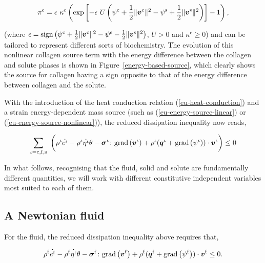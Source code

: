 \begin{equation}
\pi^{\mathrm{c}}=\epsilon\ \kappa^{\mathrm{c}}\left( \mathrm{exp}
\left[-\epsilon\ U \left(\psi^{\mathrm{c}}+\frac{1}{2} \Vert\bv^{\mathrm{c}}\Vert^2 - 
 \psi^{\mathrm{s}}+\frac{1}{2} \Vert\bv^{\mathrm{s}}\Vert^2\right) \right]
 - 1\right),
\label{eu-energy-source-nonlinear}
\end{equation}

\noindent (where $\epsilon =
\mathrm{sign}\left(\psi^{\mathrm{c}}+\frac{1}{2}
\Vert\mbox{\boldmath$ v$}^{\mathrm{c}}\Vert^2 - \psi^{\mathrm{s}}-\frac{1}{2}
\Vert\mbox{\boldmath$ v$}^{\mathrm{s}}\Vert^2\right)$, $U>0$ and
$\kappa^{\mathrm{c}}\geq 0$) and can be tailored to represent
different sorts of biochemistry. The evolution of this nonlinear
collagen source term with the energy difference between the collagen
and solute phases is shown in Figure~\ref{energy-based-source}, which
clearly shows the source for collagen having a sign opposite to that
of the energy difference between collagen and the solute.

With the introduction of the heat conduction relation
(\ref{eu-heat-conduction}) and a strain energy-dependent mass source
(such as (\ref{eu-energy-source-linear}) or
(\ref{eu-energy-source-nonlinear})), the reduced dissipation
inequality now reads,

\begin{equation}
\sum\limits_{\iota=\mathrm{c},\mathrm{f},\mathrm{s}}\ \bigg(\rho^{\iota}
\dot{e^{\iota}} - \rho^{\iota} 
\dot{\eta^{\iota}} \theta
-\Bsigma^{\iota}\colon\mathrm{grad}\left(\bv^{\iota}\right)+ \rho^{\iota}
(\bq^{\iota}+\mathrm{grad}\left(\psi^{\iota}\right)) \cdot\bv^{\iota}
\bigg) \leq 0
\label{eu-reduced-dissipation-1}
\end{equation}

In what follows, recognising that the fluid, solid and solute are
fundamentally different quantities, we will work with different
constitutive independent variables most suited to each of them.

\subsection{A Newtonian fluid}
\label{eu-newtonian-fluid}

For the fluid, the reduced dissipation inequality above requires that,


\begin{equation}
\rho^{\mathrm{f}}
\dot{e^{\mathrm{f}}} - \rho^{\mathrm{f}} 
\dot{\eta^{\mathrm{f}}} \theta
-\mbox{\boldmath$\sigma$}^{\mathrm{f}}\colon\mathrm{grad}\left(\mbox{\boldmath$ v$}^{\mathrm{f}}\right)+
\rho^{\mathrm{f}} 
(\mbox{\boldmath$ q$}^{\mathrm{f}}+\mathrm{grad}\left(\psi^{\mathrm{f}}\right)) \cdot\mbox{\boldmath$ v$}^{\mathrm{f}}
\leq 0.
\label{reduced-dissipation-fluid}
\end{equation}

